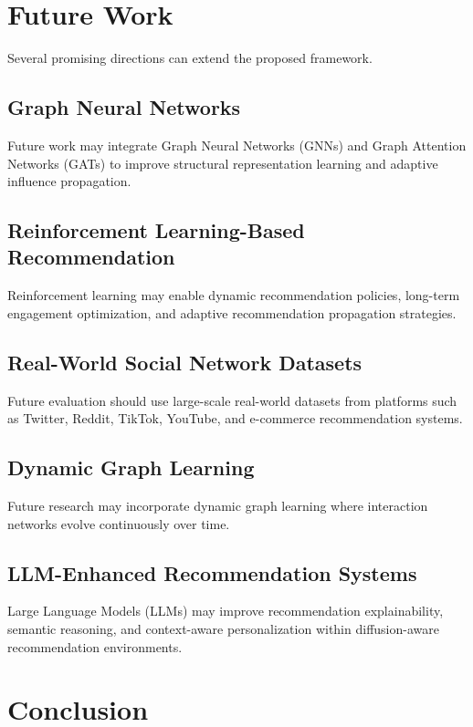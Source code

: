 \documentclass{article}
\begin{document}
\section{Future Work}

Several promising directions can extend the proposed framework.

\subsection{Graph Neural Networks}

Future work may integrate Graph Neural Networks (GNNs) and Graph Attention Networks (GATs) to improve structural representation learning and adaptive influence propagation.

\subsection{Reinforcement Learning-Based Recommendation}

Reinforcement learning may enable dynamic recommendation policies, long-term engagement optimization, and adaptive recommendation propagation strategies.

\subsection{Real-World Social Network Datasets}

Future evaluation should use large-scale real-world datasets from platforms such as Twitter, Reddit, TikTok, YouTube, and e-commerce recommendation systems.

\subsection{Dynamic Graph Learning}

Future research may incorporate dynamic graph learning where interaction networks evolve continuously over time.

\subsection{LLM-Enhanced Recommendation Systems}

Large Language Models (LLMs) may improve recommendation explainability, semantic reasoning, and context-aware personalization within diffusion-aware recommendation environments.

\section{Conclusion}
\end{document}
